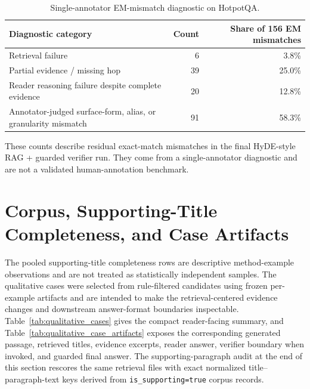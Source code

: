 \documentclass[pdflatex,sn-basic,Numbered]{sn-jnl}
\begin{document}
\begin{table}[t]
\centering
\caption{Single-annotator EM-mismatch diagnostic on HotpotQA.}
\label{tab:single_annotator_error_taxonomy}
\small
\begin{tabularx}{\textwidth}{>{\raggedright\arraybackslash}X r r}
\toprule
Diagnostic category & Count & Share of 156 EM mismatches \\
\midrule
Retrieval failure & 6 & 3.8\% \\
Partial evidence / missing hop & 39 & 25.0\% \\
Reader reasoning failure despite complete evidence & 20 & 12.8\% \\
Annotator-judged surface-form, alias, or granularity mismatch & 91 & 58.3\% \\
\bottomrule
\end{tabularx}
\begin{tablenotes}
\footnotesize
\item These counts describe residual exact-match mismatches in the final HyDE-style RAG + guarded verifier run. They come from a single-annotator diagnostic and are not a validated human-annotation benchmark.
\end{tablenotes}
\end{table}

\FloatBarrier
\section{Corpus, Supporting-Title Completeness, and Case Artifacts}
\label{sec:supp_evidence_case_artifacts}

The pooled supporting-title completeness rows are descriptive method-example observations and are not treated as statistically independent samples. The qualitative cases were selected from rule-filtered candidates using frozen per-example artifacts and are intended to make the retrieval-centered evidence changes and downstream answer-format boundaries inspectable. Table~\ref{tab:qualitative_cases} gives the compact reader-facing summary, and Table~\ref{tab:qualitative_case_artifacts} exposes the corresponding generated passage, retrieved titles, evidence excerpts, reader answer, verifier boundary when invoked, and guarded final answer. The supporting-paragraph audit at the end of this section rescores the same retrieval files with exact normalized title--paragraph-text keys derived from \texttt{is\_supporting=true} corpus records.



\FloatBarrier


\FloatBarrier


\end{document}
